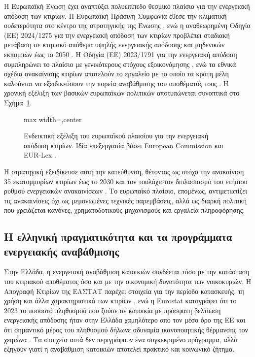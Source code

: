 Η Ευρωπαϊκή Ένωση έχει αναπτύξει πολυεπίπεδο θεσμικό πλαίσιο για την
ενεργειακή απόδοση των κτιρίων. Η Ευρωπαϊκή Πράσινη Συμφωνία έθεσε την
κλιματική ουδετερότητα στο κέντρο της στρατηγικής της Ένωσης
\cite{ec_green_deal_2019}, ενώ η αναθεωρημένη Οδηγία (ΕΕ) 2024/1275 για την
ενεργειακή απόδοση των κτιρίων προβλέπει σταδιακή μετάβαση σε κτιριακό απόθεμα
υψηλής ενεργειακής απόδοσης και μηδενικών εκπομπών έως το 2050
\cite{eurlex_epbd_2024}. Η Οδηγία (ΕΕ) 2023/1791 για την ενεργειακή απόδοση
συμπληρώνει το πλαίσιο με γενικότερους στόχους εξοικονόμησης
\cite{eurlex_eed_2023}, ενώ τα εθνικά σχέδια ανακαίνισης κτιρίων αποτελούν το
εργαλείο με το οποίο τα κράτη μέλη καλούνται να εξειδικεύσουν την πορεία
αναβάθμισης του αποθέματός τους \cite{ec_nbrp_2026}. Η χρονική εξέλιξη των
βασικών ευρωπαϊκών πολιτικών αποτυπώνεται συνοπτικά στο
Σχήμα~\ref{fig:policy-timeline}.

\begin{figure}[!htbp]
    \centering
    \begin{adjustbox}{max width=\textwidth,center}
        
    \end{adjustbox}
    \caption[Εξέλιξη του ευρωπαϊκού πλαισίου για την ενεργειακή απόδοση κτιρίων]{Ενδεικτική εξέλιξη του ευρωπαϊκού πλαισίου για την ενεργειακή απόδοση κτιρίων. Ιδία επεξεργασία βάσει European Commission και EUR-Lex \cite{ec_renovation_wave_2026,eurlex_epbd_2024,ec_nbrp_2026}.}
    \label{fig:policy-timeline}
\end{figure}

Η στρατηγική  εξειδίκευσε αυτή την κατεύθυνση, θέτοντας
ως στόχο την ανακαίνιση 35 εκατομμυρίων κτιρίων έως το 2030 και τον τουλάχιστον
διπλασιασμό του ετήσιου ρυθμού ενεργειακών ανακαινίσεων
\cite{ec_renovation_wave_2026,ec_renovation_wave_com_2020}. Το ευρωπαϊκό
πλαίσιο, επομένως, αντιμετωπίζει τις ανακαινίσεις όχι ως μεμονωμένες τεχνικές
παρεμβάσεις, αλλά ως διαρκή πολιτική που χρειάζεται κανόνες, χρηματοδοτικούς
μηχανισμούς και εργαλεία πληροφόρησης.

\subsection{Η ελληνική πραγματικότητα και τα προγράμματα ενεργειακής αναβάθμισης}

Στην Ελλάδα, η ενεργειακή αναβάθμιση κατοικιών συνδέεται τόσο με την κατάσταση
του κτιριακού αποθέματος όσο και με την οικονομική δυνατότητα των νοικοκυριών.
Η Απογραφή Κτιρίων της ΕΛΣΤΑΤ παρέχει στοιχεία για την περίοδο κατασκευής, τη
χρήση και άλλα χαρακτηριστικά των κτιρίων \cite{elstat_buildings_census_2021},
ενώ η Eurostat καταγράφει ότι το 2023 το ποσοστό πληθυσμού που ζούσε σε
κατοικία με πρόσφατη βελτίωση ενεργειακής απόδοσης ήταν στην Ελλάδα χαμηλότερο
από τον μέσο όρο της ΕΕ και ότι σημαντικό μέρος του πληθυσμού δήλωνε αδυναμία
ικανοποιητικής θέρμανσης τον χειμώνα
\cite{eurostat_living_conditions_energy_efficiency_2026}. Τα στοιχεία αυτά δεν
περιγράφουν ένα συγκεκριμένο πρόγραμμα, αλλά εξηγούν γιατί η αναβάθμιση
κατοικιών αποτελεί πρακτικό και κοινωνικό ζήτημα.

